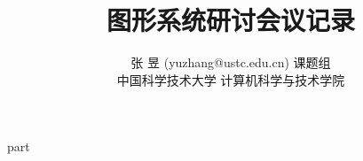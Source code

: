 \documentclass[a4paper,11pt,titlepage]{article}
\begin{document}
\title{图形系统研讨会议记录}

\author{
\rm 张 昱 (yuzhang@ustc.edu.cn) 课题组\\
中国科学技术大学 计算机科学与技术学院
}

\maketitle
\tableofcontents
\setcounter{tocdepth}{3}
\newpage
{}

{part}
\newpage
\begin{footnotesize}
\nocite{*}

\end{footnotesize}
\end{document}
